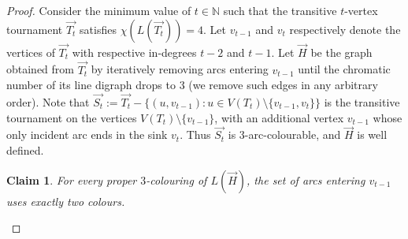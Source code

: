 \documentclass[11pt,a4aper]{article}
\newtheorem{claim}[theorem]{Claim}
\DeclareRobustCommand*{\ora}{\overrightarrow}
\newcommand*{\orH}{\ora{H}}
\newcommand*{\orTt}{\ora{T_t}}
\newcommand*{\orSt}{\ora{S_t}}
\newcommand{\nicolas}[1]{{\color{purple} NT: #1}}
\begin{document}
\begin{proof}
  
  Consider the minimum value of $t\in \mathbb N$ such that the transitive $t$-vertex tournament $\orTt$ satisfies
  $\chi(L(\orTt))=4$. Let $v_{t-1}$ and $v_t$ respectively denote the vertices of $\orTt$ with respective in-degrees
  $t-2$ and $t-1$. %
  Let $\orH$ be the graph obtained from $\orTt$ by iteratively removing arcs entering $v_{t-1}$
  until the chromatic number of its line digraph drops to 3 (we remove such edges in any arbitrary order). Note that
  $\ora{S_t} := \orTt-\{(u, v_{t-1}) : u \in V(T_{t})\setminus\{v_{t-1},v_{t}\}\}$ is the
  transitive tournament on the vertices $V(T_t)\setminus \{v_{t-1}\}$, with an
  additional vertex $v_{t-1}$ whose only incident arc ends in the sink $v_t$. Thus
  $\orSt$ is 3-arc-colourable,  and $\orH$ is well defined.  



  \begin{claim}
   \label{clm: H}
   For every proper $3$-colouring of $L(\orH)$, the set of arcs entering $v_{t-1}$ uses exactly two colours.
  \end{claim}


\end{proof}
\end{document}
